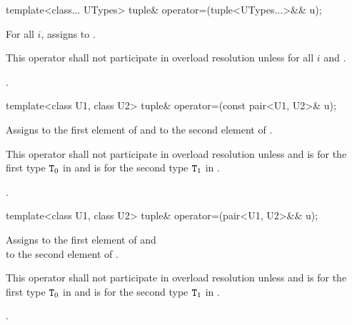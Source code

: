 %
\begin{itemdecl}
template<class... UTypes> tuple& operator=(tuple<UTypes...>&& u);
\end{itemdecl}

\begin{itemdescr}
\pnum
\effects For all $i$, assigns  to
.

\pnum
\remarks This operator shall not participate in overload resolution unless
 for all $i$ and
.

\pnum
\returns {}.
\end{itemdescr}

%
%
\begin{itemdecl}
template<class U1, class U2> tuple& operator=(const pair<U1, U2>& u);
\end{itemdecl}

\begin{itemdescr}
\pnum
\effects  Assigns  to the first element of 
and  to the second element of .

\pnum
\remarks This operator shall not participate in overload resolution unless
 and
 is  for the first type $\texttt{T}_0$ in
 and  is  for the
second type $\texttt{T}_1$ in .

\pnum
\returns {}.
\end{itemdescr}

%
%
\begin{itemdecl}
template<class U1, class U2> tuple& operator=(pair<U1, U2>&& u);
\end{itemdecl}

\begin{itemdescr}
\pnum
\effects Assigns  to the first
element of  and\\  to the
second element of .

\pnum
\remarks
This operator shall not participate in overload resolution unless
 and
 is  for the first type $\texttt{T}_0$ in
 and  is  for the second
type $\texttt{T}_1$ in .

\pnum
\returns {}.
\end{itemdescr}

